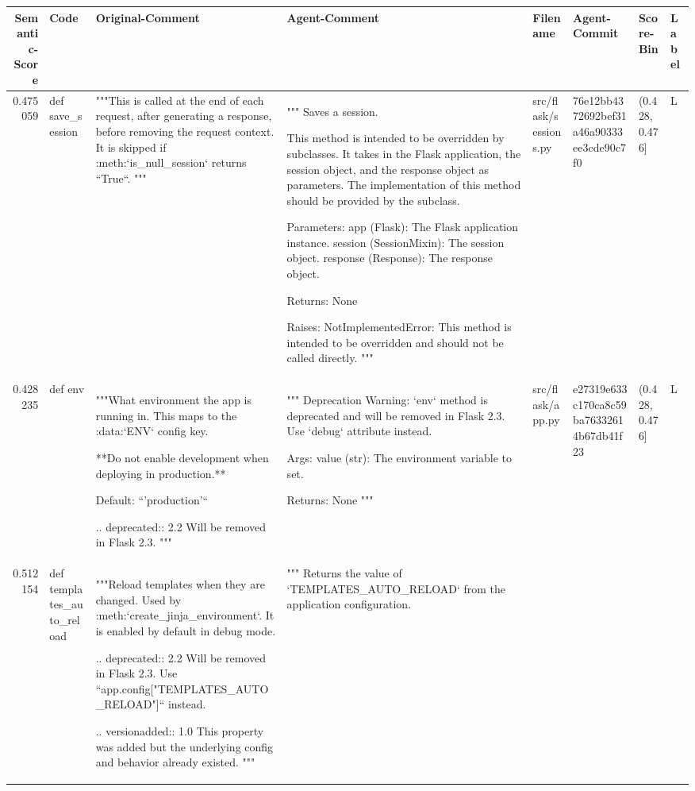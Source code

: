 \begin{tabular}{rlllllll}
\toprule
Semantic-Score & Code & Original-Comment & Agent-Comment & Filename & Agent-Commit & Score-Bin & Label \\
\midrule
0.475059 & def save_session & """This is called at the end of each request, after generating
        a response, before removing the request context. It is skipped
        if :meth:`is_null_session` returns ``True``.
        """ & """
Saves a session.

This method is intended to be overridden by subclasses. It takes in the Flask application,
the session object, and the response object as parameters. The implementation of this
method should be provided by the subclass.

Parameters:
app (Flask): The Flask application instance.
session (SessionMixin): The session object.
response (Response): The response object.

Returns:
None

Raises:
NotImplementedError: This method is intended to be overridden and should not be called directly.
""" & src/flask/sessions.py & 76e12bb4372692bef31a46a90333ee3cde90c7f0 & (0.428, 0.476] & L \\
0.428235 & def env & """What environment the app is running in. This maps to the :data:`ENV` config
        key.

        **Do not enable development when deploying in production.**

        Default: ``'production'``

        .. deprecated:: 2.2
            Will be removed in Flask 2.3.
        """ & """
Deprecation Warning: `env` method is deprecated and will be removed in Flask 2.3.
Use `debug` attribute instead.

Args:
    value (str): The environment variable to set.

Returns:
    None
""" & src/flask/app.py & e27319e633c170ca8c59ba76332614b67db41f23 & (0.428, 0.476] & L \\
0.512154 & def templates_auto_reload & """Reload templates when they are changed. Used by
        :meth:`create_jinja_environment`. It is enabled by default in debug mode.

        .. deprecated:: 2.2
            Will be removed in Flask 2.3. Use ``app.config["TEMPLATES_AUTO_RELOAD"]``
            instead.

        .. versionadded:: 1.0
            This property was added but the underlying config and behavior
            already existed.
        """ & """
Returns the value of `TEMPLATES_AUTO_RELOAD` from the application configuration.


\end{tabular}
